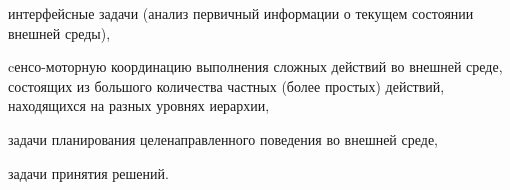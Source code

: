 \begin{scnsubstruct}
\begin{scnsubstruct}
\begin{scnsubdividing}
\begin{scnindent}
{\begin{scnitemize}
                            \item интерфейсные задачи (анализ первичный информации о текущем состоянии
                            внешней среды),
                            \item cенсо-моторную координацию выполнения сложных действий во внешней среде,
                            состоящих из большого количества частных (более простых) действий, находящихся
                            на разных уровнях иерархии,
                            \item задачи планирования целенаправленного поведения во внешней среде,
                            \item задачи принятия решений.
                        \end{scnitemize}
                    }
                \end{scnindent}
                \begin{scnindent}
                \end{scnindent}


\end{scnsubdividing}
\end{scnsubstruct}
\end{scnsubstruct}
